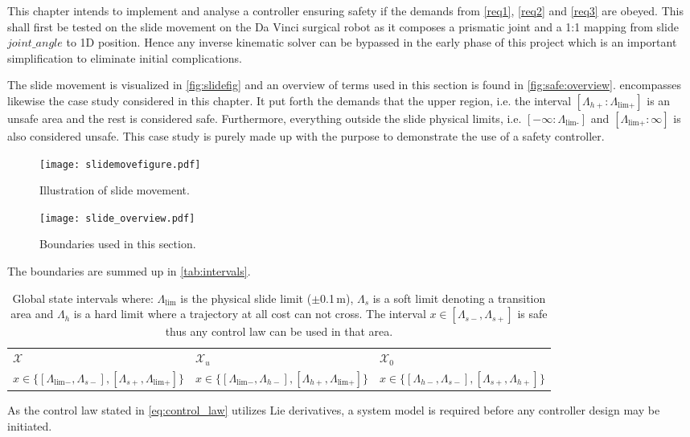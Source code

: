 This chapter intends to implement and analyse a controller ensuring safety if the demands from \autoref{req1}, \ref{req2} and \ref{req3} are obeyed. This shall first be tested on the slide movement on the Da Vinci surgical robot as it composes a prismatic joint and a 1:1 mapping from slide $joint\_angle$ to 1D position. Hence any inverse kinematic solver can be bypassed in the early phase of this project which is an important simplification to eliminate initial complications.

The slide movement is visualized in \autoref{fig:slidefig} and an overview of terms used in this section is found in \autoref{fig:safe:overview}.  encompasses likewise the case study considered in this chapter. It put forth the demands that the upper region, i.e. the interval $[\Lambda_{h+}:\Lambda_\text{lim+}]$ is an unsafe area and the rest is considered safe. Furthermore, everything outside the slide physical limits, i.e. $[-\infty:\Lambda_\text{lim-}]$ and $[\Lambda_\text{lim+}:\infty]$ is also considered unsafe. This case study is purely made up with the purpose to demonstrate the use of a safety controller.
\begin{figure}[H]
    \centering
    \begin{minipage}{.5\textwidth}
        \centering
        \texttt{[image: slidemovefigure.pdf]}
        \caption{Illustration of slide movement.}
        \label{fig:slidefig}
    \end{minipage}%
    \begin{minipage}{0.5\textwidth}
        \centering
        \texttt{[image: slide\_overview.pdf]}
        \caption{Boundaries used in this section.}
        \label{fig:safe:overview}
    \end{minipage}
\end{figure}
The boundaries are summed up in \autoref{tab:intervals}.
\begin{table}[H]
	\begin{tabularx}{\textwidth}{X X X }
\rowcolor{HeaderBlue} 
$\mathcal{X}$ & $\mathcal{X}_u$  & $\mathcal{X}_0$ \\
$x \in \{[\Lambda_{\text{lim}-},\Lambda_{s-}],[\Lambda_{s+},\Lambda_{\text{lim}+}]\}$  & $x \in \{[\Lambda_{\text{lim}-},\Lambda_{h-}],[\Lambda_{h+},\Lambda_{\text{lim}+}]\} $ & $x \in \{[\Lambda_{h-},\Lambda_{s-}],[\Lambda_{s+},\Lambda_{h+}]\}$  \\
\end{tabularx}
\caption{Global state intervals where: $\Lambda_\text{lim}$ is the physical slide limit ($\pm$0.1\,m), $\Lambda_s$ is a soft limit denoting a transition area and $\Lambda_h$ is a hard limit where a trajectory at all cost can not cross. The interval $x \in [\Lambda_{s-},\Lambda_{s+}]$ is safe thus any control law can be used in that area.}
\label{tab:intervals}
\end{table}
As the control law stated in \autoref{eq:control_law} utilizes Lie derivatives, a system model is required before any controller design may be initiated.
